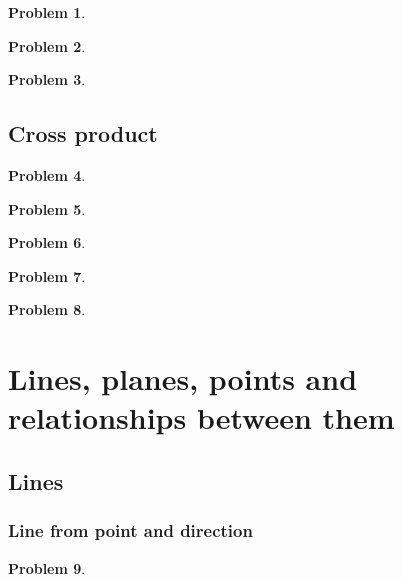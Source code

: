 \documentclass{article}
\newtheorem{problem}{Problem}
\begin{document}
\begin{problem}

\end{problem}

\begin{problem}

\end{problem}

\begin{problem}

\end{problem}

\subsection{Cross product}

\begin{problem}

\end{problem}

\begin{problem}

\end{problem}

\begin{problem}

\end{problem}



\begin{problem}

\end{problem}

\begin{problem}

\end{problem}

\section{Lines, planes, points and relationships between them}
\subsection{Lines}
\subsubsection{Line from point and direction}
\begin{problem}

\end{problem}
\end{document}
